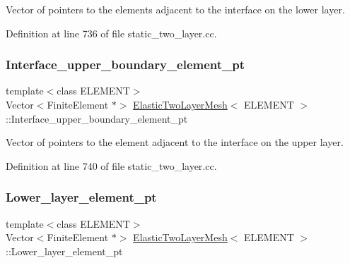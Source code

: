 Vector of pointers to the elements adjacent to the interface on the lower layer. 



Definition at line 736 of file static\+\_\+two\+\_\+layer.\+cc.

\mbox{\label{classElasticTwoLayerMesh_af8218bd023535d3dbf4af3cf7bc1c12d}} 
\subsubsection{\texorpdfstring{Interface\+\_\+upper\+\_\+boundary\+\_\+element\+\_\+pt}{Interface\_upper\_boundary\_element\_pt}}
{\footnotesize\ttfamily template$<$class E\+L\+E\+M\+E\+NT$>$ \\
Vector$<$Finite\+Element $\ast$$>$ \hyperlink{classElasticTwoLayerMesh}{Elastic\+Two\+Layer\+Mesh}$<$ E\+L\+E\+M\+E\+NT $>$\+::Interface\+\_\+upper\+\_\+boundary\+\_\+element\+\_\+pt\hspace{0.3cm}{\ttfamily [private]}}



Vector of pointers to the element adjacent to the interface on the upper layer. 



Definition at line 740 of file static\+\_\+two\+\_\+layer.\+cc.

\mbox{\label{classElasticTwoLayerMesh_a4f8c33eaaa185e8c8710883ee9b5811f}} 
\subsubsection{\texorpdfstring{Lower\+\_\+layer\+\_\+element\+\_\+pt}{Lower\_layer\_element\_pt}}
{\footnotesize\ttfamily template$<$class E\+L\+E\+M\+E\+NT$>$ \\
Vector$<$Finite\+Element $\ast$$>$ \hyperlink{classElasticTwoLayerMesh}{Elastic\+Two\+Layer\+Mesh}$<$ E\+L\+E\+M\+E\+NT $>$\+::Lower\+\_\+layer\+\_\+element\+\_\+pt\hspace{0.3cm}{\ttfamily [private]}}



